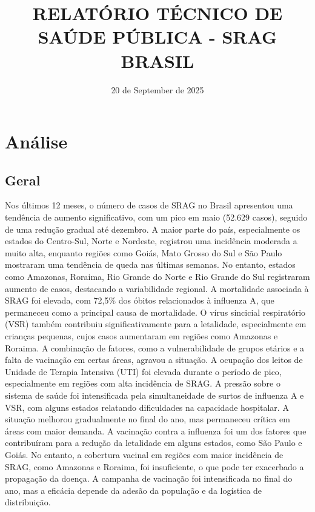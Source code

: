 \documentclass{article}%
\title{\textbf{RELATÓRIO TÉCNICO DE SAÚDE PÚBLICA - SRAG BRASIL}}%
\date{20 de September de 2025}%
\begin{document}
%
\normalsize%
\maketitle%
\section{Análise}%
\label{sec:Anlise}%
\subsection{Geral}%
\label{subsec:Geral}%
Nos últimos 12 meses, o número de casos de SRAG no Brasil apresentou uma tendência de aumento significativo, com um pico em maio (52.629 casos), seguido de uma redução gradual até dezembro. A maior parte do país, especialmente os estados do Centro{-}Sul, Norte e Nordeste, registrou uma incidência moderada a muito alta, enquanto regiões como Goiás, Mato Grosso do Sul e São Paulo mostraram uma tendência de queda nas últimas semanas. No entanto, estados como Amazonas, Roraima, Rio Grande do Norte e Rio Grande do Sul registraram aumento de casos, destacando a variabilidade regional.\newline%
%
A mortalidade associada à SRAG foi elevada, com 72,5\% dos óbitos relacionados à influenza A, que permaneceu como a principal causa de mortalidade. O vírus sincicial respiratório (VSR) também contribuiu significativamente para a letalidade, especialmente em crianças pequenas, cujos casos aumentaram em regiões como Amazonas e Roraima. A combinação de fatores, como a vulnerabilidade de grupos etários e a falta de vacinação em certas áreas, agravou a situação.\newline%
%
A ocupação dos leitos de Unidade de Terapia Intensiva (UTI) foi elevada durante o período de pico, especialmente em regiões com alta incidência de SRAG. A pressão sobre o sistema de saúde foi intensificada pela simultaneidade de surtos de influenza A e VSR, com alguns estados relatando dificuldades na capacidade hospitalar. A situação melhorou gradualmente no final do ano, mas permaneceu crítica em áreas com maior demanda.\newline%
%
A vacinação contra a influenza foi um dos fatores que contribuíram para a redução da letalidade em alguns estados, como São Paulo e Goiás. No entanto, a cobertura vacinal em regiões com maior incidência de SRAG, como Amazonas e Roraima, foi insuficiente, o que pode ter exacerbado a propagação da doença. A campanha de vacinação foi intensificada no final do ano, mas a eficácia depende da adesão da população e da logística de distribuição.\newline%
\end{document}
